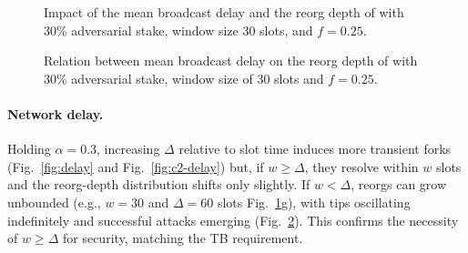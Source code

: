 \begin{figure}[htbp!]
\caption{Impact of the mean broadcast delay and the reorg depth of \ProjBase with 30\% adversarial stake, window size 30 slots, and $f=0.25$.}
\label{fig:window}
\end{figure}

\begin{figure}[htbp!]
\caption{Relation between mean broadcast delay on the reorg depth of \ProjBase with 30\% adversarial stake, window size of 30 slots and $f=0.25$.}
\label{fig:window-attack}
\end{figure}

\paragraph{Network delay.}
Holding $\alpha=0.3$, increasing $\Delta$ relative to slot time induces more transient forks (Fig.~\ref{fig:delay} and Fig.~\ref{fig:c2-delay}) but, if $w\ge\Delta$, they resolve within $w$ slots and the reorg-depth distribution shifts only slightly. If $w<\Delta$, reorgs can grow unbounded (e.g., $w=30$ and $\Delta=60$ slots Fig.~\ref{fig:window}g), with tips oscillating indefinitely and successful attacks emerging (Fig.~\ref{fig:window-attack}). This confirms the necessity of $w\ge\Delta$ for security, matching the TB requirement.


